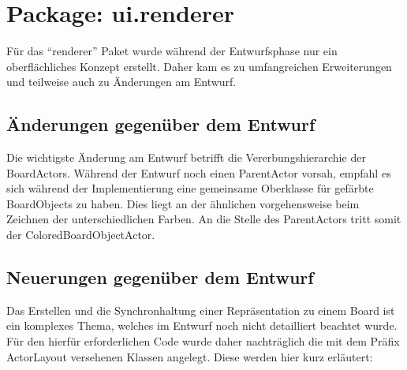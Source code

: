 \section{Package: ui.renderer}

Für das "`renderer"' Paket wurde während der Entwurfsphase nur ein oberflächliches Konzept erstellt.
Daher kam es zu umfangreichen Erweiterungen und teilweise auch zu Änderungen am Entwurf.

\subsection{Änderungen gegenüber dem Entwurf}

Die wichtigste Änderung am Entwurf betrifft die Vererbungshierarchie der BoardActors. 
Während der Entwurf noch einen ParentActor vorsah, empfahl es sich während der Implementierung eine gemeinsame Oberklasse für gefärbte BoardObjects zu haben.
Dies liegt an der ähnlichen vorgehensweise beim Zeichnen der unterschiedlichen Farben.
An die Stelle des ParentActors tritt somit der ColoredBoardObjectActor.

\subsection{Neuerungen gegenüber dem Entwurf}

Das Erstellen und die Synchronhaltung einer Repräsentation zu einem Board ist ein komplexes Thema, welches im Entwurf noch nicht detailliert beachtet wurde.
Für den hierfür erforderlichen Code wurde daher nachträglich die mit dem Präfix ActorLayout versehenen Klassen angelegt.
Diese werden hier kurz erläutert:

